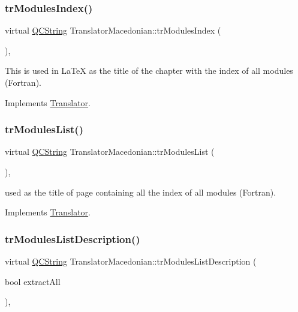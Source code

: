 \subsubsection{\texorpdfstring{trModulesIndex()}{trModulesIndex()}}
{\footnotesize\ttfamily virtual \mbox{\hyperlink{class_q_c_string}{Q\+C\+String}} Translator\+Macedonian\+::tr\+Modules\+Index (\begin{DoxyParamCaption}{ }\end{DoxyParamCaption})\hspace{0.3cm}{\ttfamily [inline]}, {\ttfamily [virtual]}}

This is used in La\+TeX as the title of the chapter with the index of all modules (Fortran). 

Implements \mbox{\hyperlink{class_translator}{Translator}}.

\mbox{\label{class_translator_macedonian_a7ba6ccaadaf2451e97c30e4cf1f9fe22}} 
\subsubsection{\texorpdfstring{trModulesList()}{trModulesList()}}
{\footnotesize\ttfamily virtual \mbox{\hyperlink{class_q_c_string}{Q\+C\+String}} Translator\+Macedonian\+::tr\+Modules\+List (\begin{DoxyParamCaption}{ }\end{DoxyParamCaption})\hspace{0.3cm}{\ttfamily [inline]}, {\ttfamily [virtual]}}

used as the title of page containing all the index of all modules (Fortran). 

Implements \mbox{\hyperlink{class_translator}{Translator}}.

\mbox{\label{class_translator_macedonian_acc0fc8935f235a8c96e1bc7cd6d83e94}} 
\subsubsection{\texorpdfstring{trModulesListDescription()}{trModulesListDescription()}}
{\footnotesize\ttfamily virtual \mbox{\hyperlink{class_q_c_string}{Q\+C\+String}} Translator\+Macedonian\+::tr\+Modules\+List\+Description (\begin{DoxyParamCaption}\item[{bool}]{extract\+All }\end{DoxyParamCaption})\hspace{0.3cm}{\ttfamily [inline]}, {\ttfamily [virtual]}}

